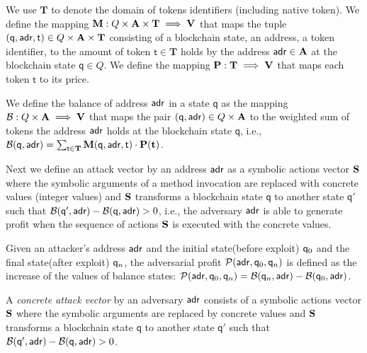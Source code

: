 We use $\mathbf{T}$ to denote the domain of tokens identifiers (including native token). 
We define the mapping $\mathbf{M}:  Q \times \mathbf{A} \times  \mathbf{T} \implies \mathbf{V}$ that maps the tuple $(\mathsf{q},\mathsf{adr},\mathsf{t}) \in Q \times \mathbf{A} \times \mathbf{T}$ consisting of a blockchain state, an address, a token identifier, to the amount of token $\mathsf{t} \in \mathbf{T}$ holds by the address $\mathsf{adr} \in \mathbf{A}$ at the blockchain state $\mathsf{q} \in Q$. We define the mapping $\mathbf{P}: \mathbf{T} \implies \mathbf{V}$ that maps each token $\mathsf{t}$ to its price. 

\begin{definition}[Balance]
We define the balance of address $\mathsf{adr}$ in a state $\mathsf{q}$ as the mapping $\mathcal{B}: Q \times \mathbf{A} \implies \mathbf{V}$
    that maps the pair $(\mathsf{q},\mathsf{adr}) \in Q \times \mathbf{A}$ to the weighted sum of tokens the address $\mathsf{adr}$ holds at the blockchain state $\mathsf{q}$, i.e., 
    $\mathcal{B}(\mathsf{q},\mathsf{adr})= \sum_{\mathsf{t} \in \mathbf{T}}{\mathbf{M}(\mathsf{q},\mathsf{adr},\mathsf{t}) \cdot \mathbf{P}(\mathbf{t})}$. 
\end{definition}



Next we define an attack vector by an address $\mathsf{adr}$ as a symbolic actions vector $\mathbf{S}$ where the symbolic arguments of a method invocation are replaced with concrete values (integer values) and $\mathbf{S}$ transforms a blockchain state $\mathsf{q}$ to another state $\mathsf{q}'$ such that $\mathcal{B}(\mathsf{q}',\mathsf{adr}) -  \mathcal{B}(\mathsf{q},\mathsf{adr}) > 0$, i.e., the adversary $\mathsf{adr}$ is able to generate profit when the sequence of actions $\mathbf{S}$ is executed with the concrete values. 

\begin{definition}[Profit]
\label{profit}
Given an attacker's address $\mathsf{adr}$ and the initial state(before exploit) $\mathsf{q}_0$ and the final state(after exploit) $\mathsf{q}_n$, the adversarial profit $\mathcal{P}(\mathsf{adr}, \mathsf{q}_0, \mathsf{q}_n)$ is defined as the increase of the values of balance states: $\mathcal{P}(\mathsf{adr}, \mathsf{q}_0, \mathsf{q}_n) = \mathcal{B}(\mathsf{q}_n,\mathsf{adr}) - \mathcal{B}(\mathsf{q}_0,\mathsf{adr})$.
\end{definition}
%
%
\begin{definition} \label{def:concrete}
    A \emph{concrete attack vector} by an adversary $\mathsf{adr}$ consists of a symbolic actions vector $\mathbf{S}$ where the symbolic arguments are replaced by concrete values and $\mathbf{S}$ transforms a blockchain state $\mathsf{q}$ to another state $\mathsf{q}'$ such that $\mathcal{B}(\mathsf{q}',\mathsf{adr}) -  \mathcal{B}(\mathsf{q},\mathsf{adr}) > 0$.
\end{definition}

